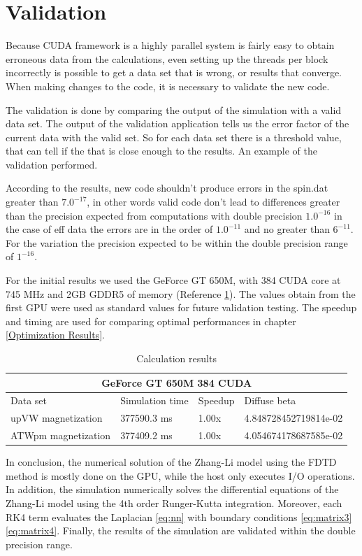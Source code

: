 \section{Validation}

Because CUDA framework is a highly parallel system is fairly easy to obtain erroneous data from the calculations, even setting up the threads per block incorrectly is possible to get a data set that is wrong, or results that converge. When making changes to the code, it is necessary to validate the new code.

The validation is done by comparing the output of the simulation with a valid data set. The output of the validation application tells us the error factor of the current data with the valid set. So for each data set there is a threshold value, that can tell if the that is close enough to the results. An example of the validation performed.

According to the results, new code shouldn't produce errors in the spin.dat greater than $7.0^{-17}$, in other words valid code don't lead to differences greater than the precision expected from computations with double precision $1.0^{-16}$ in the case of eff data the errors are in the order of $1.0^{-11}$ and no greater than $6^{-11}$. For the variation the precision expected to be within the double precision range of $1^{-16}$. 

For the initial results we used the GeForce GT 650M, with 384 CUDA core at 745 MHz and 2GB GDDR5 of memory (Reference \ref{tab:results}). The values obtain from the first GPU were used as standard values for future validation testing. The speedup and timing are used for comparing optimal performances in chapter \ref{Optimization Results}.

\begin{table}[h]
\centering
\begin{tabular}{| l | l | l | l |}
\hline
\multicolumn{4}{|c|}{GeForce GT 650M  384 CUDA} \\
\hline
Data set & Simulation time & Speedup & Diffuse beta  \\
\hline
upVW magnetization & 377590.3 ms & 1.00x & 4.848728452719814e-02 \\
\hline
ATWpm magnetization & 377409.2 ms & 1.00x & 4.054674178687585e-02 \\
\hline
\end{tabular}
\caption{Calculation results}
\label{tab:results}
\end{table}


\vspace{4.0em}

In conclusion, the numerical solution of the Zhang-Li model using the FDTD method is mostly done on the GPU, while the host only executes I/O operations. In addition, the simulation numerically solves the differential equations of the Zhang-Li model using the 4th order Runger-Kutta integration. Moreover, each RK4 term evaluates the Laplacian \ref{eq:nn} with boundary conditions \ref{eq:matrix3} \ref{eq:matrix4}. Finally, the results of the simulation are validated within the double precision range.



